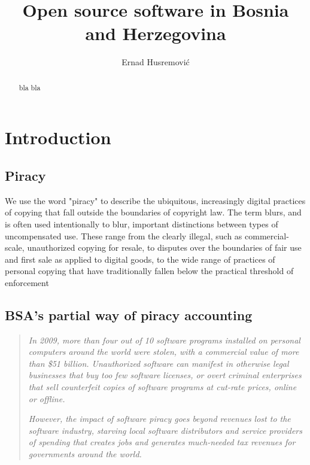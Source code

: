 \documentclass[times, utf8, seminar]{fit}
\begin{document}
\title{Open source software in Bosnia and Herzegovina}

\author{Ernad Husremović}


\maketitle

\tableofcontents

\listoftables
\listoffigures

\begin{abstract}

bla bla 

\end{abstract}


\chapter{Introduction}

\section{Piracy}

We use the word "piracy" to describe the ubiquitous, increasingly digital practices of copying that fall outside the boundaries of copyright law. The term blurs, and is often used intentionally to blur, important distinctions between types of uncompensated use. These range from the clearly illegal, such as commercial-scale, unauthorized copying for resale, to disputes over the boundaries of fair use and first sale as applied to digital goods, to the wide range of practices of personal copying that have traditionally fallen below the practical threshold of enforcement\citep{mediapiracy}


\section{BSA's partial way of piracy accounting}


\begin{quotation}
\emph{In 2009, more than four out of 10 software programs installed on personal computers around the world were stolen, with a commercial value of more than \$51 billion. Unauthorized software can manifest in otherwise legal businesses that buy too few software licenses, or overt criminal enterprises that sell counterfeit copies of software programs at cut-rate prices, online or offline.}

\emph{However, the impact of software piracy goes beyond revenues lost to the software industry, starving local software distributors and service providers of spending that creates jobs and generates much-needed tax revenues for governments around the world.}\citep{bsapiracyimpact}
\end{quotation}\\
\end{document}
